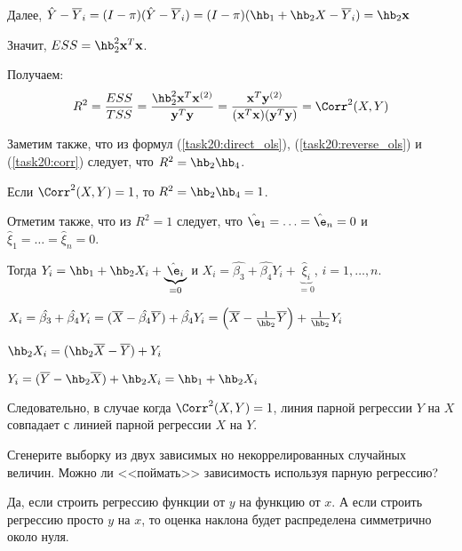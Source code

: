\documentclass[pdftex,11pt,openany]{book}\usepackage[]{graphicx}\usepackage[]{color}
\begin{document}
\begin{solution}
Далее, $\hat{Y} - \overline{Y}_i = (I - \pi)(\hat{Y} - \overline{Y}_i) = (I - \pi)(\hb_1 + \hb_2 X - \overline{Y}_i) = \hb_2 \textbf{x}$

Значит, $ESS = \hb_2^2 \textbf{x}^T \textbf{x}$.

Получаем:
\begin{equation}
\label{task20:corr}R^2 = \frac{ESS}{TSS} = \frac{\hb_2^2 \textbf{x}^T \textbf{x}^{(2)}}{\textbf{y}^T \textbf{y}} = \frac{\textbf{x}^T \textbf{y}^{(2)}}{(\textbf{x}^T \textbf{x})(\textbf{y}^T \textbf{y})} = \Corr^2(X, Y)
\end{equation}

Заметим также, что из формул (\ref{task20:direct_ols}), (\ref{task20:reverse_ols}) и (\ref{task20:corr}) следует, что $R^2 = \hb_2 \hb_4$.

Если $\Corr^2(X, Y) = 1$, то $R^2 = \hb_2 \hb_4 = 1$.

Отметим также, что из $R^2 = 1$ следует, что $\hat{\e}_1 = \ldots = \hat{\e}_n = 0$ и $\hat{\xi}_1 = \ldots = \hat{\xi}_n = 0$.

Тогда $Y_i = \hb_1 + \hb_2 X_i + \underbrace{\hat{\e}_i}_{=0}$ и $X_i = \hat{\beta_3} + \hat{\beta_4} Y_i + \underbrace{\hat{\xi}_i}_{=0}$, $i = 1, \ldots, n$.

$X_i = \hat{\beta_3} + \hat{\beta_4} Y_i = (\overline{X} - \hat{\beta_4}\overline{Y}) + \hat{\beta_4} Y_i = \left( \overline{X} - \frac{1}{\hb_2} \overline{Y} \right) + \frac{1}{\hb_2} Y_i$

$\hb_2 X_i = (\hb_2 \overline{X} - \overline{Y}) + Y_i$

$Y_i = (\overline{Y} - \hb_2 \overline{X}) + \hb_2 X_i = \hb_1 + \hb_2 X_i$

Следовательно, в случае когда $\Corr^2(X, Y) = 1$, линия парной регрессии $Y$ на $X$ совпадает с линией парной регрессии $X$ на $Y$.
\end{solution}



\begin{problem}
Сгенерите выборку из двух зависимых но некоррелированных случайных величин. Можно ли <<поймать>> зависимость используя парную регрессию?
\end{problem}

\begin{solution}
Да, если строить регрессию функции от $y$ на функцию от $x$. А если строить регрессию просто $y$ на $x$, то оценка наклона будет распределена симметрично около нуля.
\end{solution}
\end{document}
